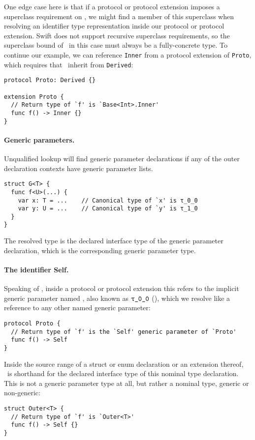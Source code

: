 \documentclass[../generics]{subfiles}
\begin{document}
One edge case here is that if a protocol or protocol extension imposes a superclass requirement on \tSelf, we might find a member of this superclass when resolving an identifier type representation inside our protocol or protocol extension. Swift does not support recursive superclass requirements, so the superclass bound of \tSelf\ in this case must always be a fully-concrete type. To continue our example, we can reference \texttt{Inner} from a protocol extension of \texttt{Proto}, which requires that \tSelf\ inherit from \texttt{Derived}:
\begin{Verbatim}
protocol Proto: Derived {}

extension Proto {
  // Return type of `f' is `Base<Int>.Inner'
  func f() -> Inner {}
}
\end{Verbatim}

\paragraph{Generic parameters.}
Unqualified lookup will find generic parameter declarations if any of the outer declaration contexts have generic parameter lists.
\begin{Verbatim}
struct G<T> {
  func f<U>(...) {
    var x: T = ...    // Canonical type of `x' is τ_0_0
    var y: U = ...    // Canonical type of `y' is τ_1_0
  }
}
\end{Verbatim}
The resolved type is the declared interface type of the generic parameter declaration, which is the corresponding generic parameter type.

\paragraph{The identifier Self.}
Speaking of \tSelf, inside a protocol or protocol extension this refers to the \IndexSelf implicit generic parameter named \tSelf, also known as $\rT$ (), which we resolve like a reference to any other named generic parameter:
\begin{Verbatim}
protocol Proto {
  // Return type of `f' is the `Self' generic parameter of `Proto'
  func f() -> Self
}
\end{Verbatim}

Inside the source range of a struct or enum declaration or an extension thereof, \tSelf\ is shorthand for the declared interface type of this nominal type declaration. This is not a generic parameter type at all, but rather a nominal type, generic or non-generic:
\begin{Verbatim}
struct Outer<T> {
  // Return type of `f' is `Outer<T>'
  func f() -> Self {}
}
\end{Verbatim}
\end{document}
